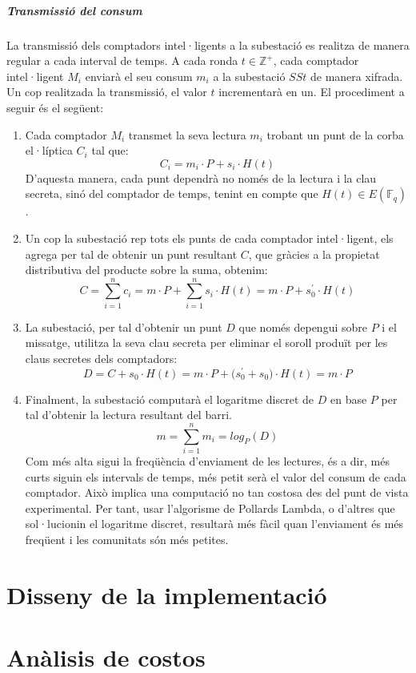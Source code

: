 \documentclass{article}
\begin{document}
\subsubsection{Transmissió del consum}\label{section:ct}
La transmissió dels comptadors intel·ligents a la subestació es realitza de manera regular a cada interval de temps. A cada ronda $t \in \mathbb{Z^+}$, cada comptador intel·ligent $M_i$ enviarà el seu consum $m_i$ a la subestació $SSt$ de manera xifrada. Un cop realitzada la transmissió, el valor $t$ incrementarà en un. El procediment a seguir és el següent:
\begin{enumerate}
	\item Cada comptador $M_i$ transmet la seva lectura $m_i$ trobant un punt de la corba el·líptica $C_i$ tal que:
	\[C_i = m_i \cdot P + s_i \cdot H(t)\]
	D'aquesta manera, cada punt dependrà no només de la lectura i la clau secreta, sinó del comptador de temps, tenint en compte que $H(t) \in E(\mathbb{F}_q)$.
	\item Un cop la subestació rep tots els punts de cada comptador intel·ligent, els agrega per tal de obtenir un punt resultant $C$, que gràcies a la propietat distributiva del producte sobre la suma, obtenim:
	\[C = \sum_{i=1}^{n}c_i = m \cdot P + \sum_{i=1}^{n}s_i \cdot H(t) = m \cdot P + s_0^{'}\cdot H(t)\]
	\item La subestació, per tal d'obtenir un punt $D$ que només depengui sobre $P$ i el missatge, utilitza la seva clau secreta per eliminar el soroll produït per les claus secretes dels comptadors:
	\[D = C + s_0 \cdot H(t) = m \cdot P + \big( s_0^{'} + s_0 \big) \cdot H(t) = m \cdot P\]
	\item Finalment, la subestació computarà el logaritme discret de $D$ en base $P$ per tal d'obtenir la lectura resultant del barri.
	\[m = \sum_{i=1}^{n} m_i = log_P(D)\]
	Com més alta sigui la freqüència d'enviament de les lectures, és a dir, més curts siguin els intervals de temps, més petit serà el valor del consum de cada comptador. Això implica una computació no tan costosa des del punt de vista experimental. Per tant, usar l'algorisme de Pollards Lambda, o d'altres que sol·lucionin el logaritme discret, resultarà més fàcil quan l'enviament és més freqüent i les comunitats són més petites.
\end{enumerate}

\newpage\part{Disseny de la implementació}\label{part:disseny}

\newpage
\part{Anàlisis de costos}\label{part:analisis}

\newpage


\end{document}
